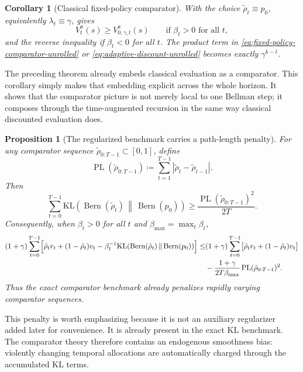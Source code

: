 \documentclass{article}
\newtheorem{proposition}[proposition]{Proposition}
\newtheorem{corollary}[corollary]{Corollary}
\theoremstyle{remark}
\DeclareMathOperator{\Bern}{Bern}
\newcommand{\KL}{\mathrm{KL}}
\newcommand{\defeq}{\coloneqq}
\newcommand{\pprior}{p_0}
\newcommand{\KLbin}[2]{\KL\!\left(\Bern(#1)\,\middle\|\,\Bern(#2)\right)}
\DeclareMathOperator{\PL}{PL}
\begin{document}
\begin{corollary}[Classical fixed-policy comparator]
\label{cor:fixed-policy-classical}
With the choice $\tilde\rho_t\equiv \pprior$, equivalently $\lambda_t\equiv \gamma$,  gives
\[
V_t^\pi(s) \ge V_{0,\gamma,t}^\pi(s)
\qquad\text{if } \beta_t>0 \text{ for all } t,
\]
and the reverse inequality if $\beta_t<0$ for all $t$.
The product term in \eqref{eq:fixed-policy-comparator-unrolled} or \eqref{eq:adaptive-discount-unrolled} becomes exactly $\gamma^{k-t}$.
\end{corollary}

The preceding theorem already embeds classical evaluation as a comparator.
This corollary simply makes that embedding explicit across the whole horizon.
It shows that the comparator picture is not merely local to one Bellman step; it composes through the time-augmented recursion in the same way classical discounted evaluation does.


\begin{proposition}[The regularized benchmark carries a path-length penalty]
\label{prop:path-length-penalty}
For any comparator sequence $\tilde\rho_{0:T-1}\subset[0,1]$, define
\[
\PL(\tilde\rho_{0:T-1}) \defeq \sum_{t=1}^{T-1}|\tilde\rho_t-\tilde\rho_{t-1}|.
\]
Then
\begin{equation}
\sum_{t=0}^{T-1}\KLbin{\tilde\rho_t}{\pprior}
\ge
\frac{\PL(\tilde\rho_{0:T-1})^2}{2T}.
\label{eq:path-length-penalty}
\end{equation}
Consequently, when $\beta_t>0$ for all $t$ and $\beta_{\max}=\max_t \beta_t$,
\begin{align}
(1+\gamma)
\sum_{t=0}^{T-1}
\Bigl[
\tilde\rho_t r_t +(1-\tilde\rho_t)v_t - \beta_t^{-1}\KLbin{\tilde\rho_t}{\pprior}
\Bigr]
\le
&(1+\gamma)
\sum_{t=0}^{T-1}
\bigl[\tilde\rho_t r_t +(1-\tilde\rho_t)v_t\bigr]
\nonumber\\
&-
\frac{1+\gamma}{2T\beta_{\max}}\PL(\tilde\rho_{0:T-1})^2.
\label{eq:path-length-penalty-benchmark}
\end{align}
Thus the exact comparator benchmark already penalizes rapidly varying comparator sequences.
\end{proposition}

This penalty is worth emphasizing because it is not an auxiliary regularizer added later for convenience.
It is already present in the exact KL benchmark.
The comparator theory therefore contains an endogenous smoothness bias: violently changing temporal allocations are automatically charged through the accumulated KL terms.
\end{document}

